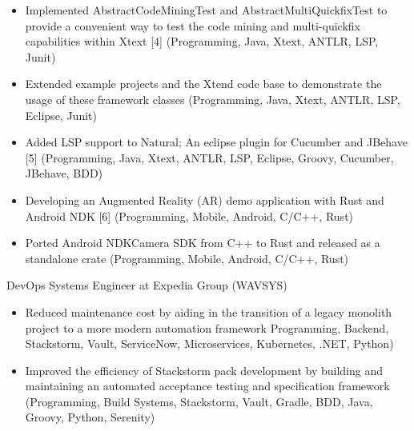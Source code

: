 \pagebreak

\begin{itemize}
  \item Implemented AbstractCodeMiningTest and AbstractMultiQuickfixTest to provide a convenient way to test the code mining and multi-quickfix capabilities within Xtext [4] {\tiny (Programming, Java, Xtext, ANTLR, LSP, Junit)}
  \item Extended example projects and the Xtend code base to demonstrate the usage of these framework classes {\tiny (Programming, Java, Xtext, ANTLR, LSP, Eclipse, Junit)}
\end{itemize}

\begin{itemize}
  \item Added LSP support to Natural; An eclipse plugin for Cucumber and JBehave [5] {\tiny (Programming, Java, Xtext, ANTLR, LSP, Eclipse, Groovy, Cucumber, JBehave, BDD)}
\end{itemize}

\begin{itemize}
  \item Developing an Augmented Reality (AR) demo application with Rust and Android NDK [6] {\tiny (Programming, Mobile, Android, C/C++, Rust)}
  \item Ported Android NDKCamera SDK from C++ to Rust and released as a standalone crate {\tiny (Programming, Mobile, Android, C/C++, Rust)}
\end{itemize}

\divider




DevOps Systems Engineer at Expedia Group (WAVSYS)


\begin{itemize}
  \item Reduced maintenance cost by aiding in the transition of a legacy monolith project to a more modern automation framework {\tiny Programming, Backend, Stackstorm, Vault, ServiceNow, Microservices, Kubernetes, .NET, Python)}
  \item Improved the efficiency of Stackstorm pack development by building and maintaining an automated acceptance testing and specification framework {\tiny (Programming, Build Systems, Stackstorm, Vault, Gradle, BDD, Java, Groovy, Python, Serenity)}
\end{itemize}

